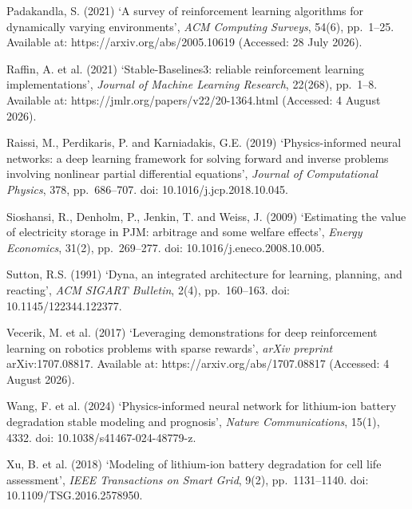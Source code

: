 \documentclass[conference]{IEEEtran}
\begin{document}
\begin{thebibliography}{}
Padakandla, S. (2021) `A survey of reinforcement learning algorithms for dynamically varying environments', \emph{ACM Computing Surveys}, 54(6), pp.\ 1--25. Available at: https://arxiv.org/abs/2005.10619 (Accessed: 28 July 2026).

Raffin, A. et al. (2021) `Stable-Baselines3: reliable reinforcement learning implementations', \emph{Journal of Machine Learning Research}, 22(268), pp.\ 1--8. Available at: https://jmlr.org/papers/v22/20-1364.html (Accessed: 4 August 2026).

Raissi, M., Perdikaris, P. and Karniadakis, G.E. (2019) `Physics-informed neural networks: a deep learning framework for solving forward and inverse problems involving nonlinear partial differential equations', \emph{Journal of Computational Physics}, 378, pp.\ 686--707. doi: 10.1016/j.jcp.2018.10.045.

Sioshansi, R., Denholm, P., Jenkin, T. and Weiss, J. (2009) `Estimating the value of electricity storage in PJM: arbitrage and some welfare effects', \emph{Energy Economics}, 31(2), pp.\ 269--277. doi: 10.1016/j.eneco.2008.10.005.

Sutton, R.S. (1991) `Dyna, an integrated architecture for learning, planning, and reacting', \emph{ACM SIGART Bulletin}, 2(4), pp.\ 160--163. doi: 10.1145/122344.122377.

Vecerik, M. et al. (2017) `Leveraging demonstrations for deep reinforcement learning on robotics problems with sparse rewards', \emph{arXiv preprint} arXiv:1707.08817. Available at: https://arxiv.org/abs/1707.08817 (Accessed: 4 August 2026).

Wang, F. et al. (2024) `Physics-informed neural network for lithium-ion battery degradation stable modeling and prognosis', \emph{Nature Communications}, 15(1), 4332. doi: 10.1038/s41467-024-48779-z.

Xu, B. et al. (2018) `Modeling of lithium-ion battery degradation for cell life assessment', \emph{IEEE Transactions on Smart Grid}, 9(2), pp.\ 1131--1140. doi: 10.1109/TSG.2016.2578950.

\end{thebibliography}
\end{document}
